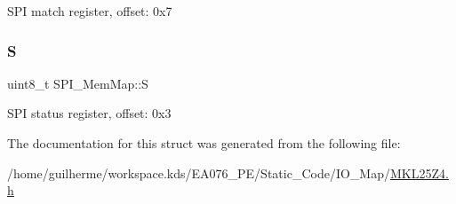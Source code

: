 S\+PI match register, offset\+: 0x7 \mbox{\label{struct_s_p_i___mem_map_ad905fa29c8b2f0ca5b93222e7961542b}} 
\subsubsection{\texorpdfstring{S}{S}}
{\footnotesize\ttfamily uint8\+\_\+t S\+P\+I\+\_\+\+Mem\+Map\+::S}

S\+PI status register, offset\+: 0x3 

The documentation for this struct was generated from the following file\+:\begin{DoxyCompactItemize}
\item 
/home/guilherme/workspace.\+kds/\+E\+A076\+\_\+\+P\+E/\+Static\+\_\+\+Code/\+I\+O\+\_\+\+Map/\hyperlink{_m_k_l25_z4_8h}{M\+K\+L25\+Z4.\+h}\end{DoxyCompactItemize}
